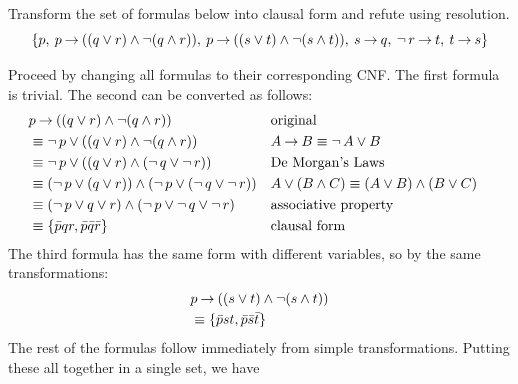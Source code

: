 \documentclass[]{exam}
\begin{document}
\begin{questions}

\question Transform the set of formulas below into clausal form and refute 
          using resolution.
\[
  \{p,\: p\mathbin{\rightarrow} ((q\lor r) \land \mathop{\neg} (q \land r)),\: p \mathbin{\rightarrow} ((s \lor t) \land
      \mathop{\neg} (s \land t)),\:  s \mathbin{\rightarrow} q,\: \mathop{\neg} r \mathbin{\rightarrow} t,\: t \mathbin{\rightarrow} s \}
  \]
\begin{solution}
Proceed by changing all formulas to their corresponding CNF. The first formula
is trivial. The second can be converted as follows:
\begin{align*}
&p \mathbin{\rightarrow} ((q\lor r) \land \mathop{\neg} (q \land r))                            && \text{original} & \\
&\equiv \mathop{\neg} p\lor ((q\lor r) \land \mathop{\neg} (q \land r))                 && A\mathbin{\rightarrow} B \equiv \mathop{\neg} A \lor B &\\ 
&\equiv \mathop{\neg} p\lor ((q\lor r) \land (\mathop{\neg} q \lor \mathop{\neg} r))             && \text{De Morgan's Laws} &\\  
&\equiv (\mathop{\neg} p\lor (q\lor r)) \land (\mathop{\neg} p\lor (\mathop{\neg} q \lor \mathop{\neg} r))&& A \lor (B \land C) \equiv (A \lor B) \land (B \lor C)&\\ 
&\equiv (\mathop{\neg} p\lor q\lor r) \land (\mathop{\neg} p \lor \mathop{\neg} q \lor \mathop{\neg} r)   && \text{associative property} &\\   
&\equiv \{\bar{p}qr, \bar{p}\bar{q}\bar{r} \}                         && \text{clausal form}&\\ 
\end{align*}
The third formula has the same form with different variables, so by the same transformations:
\begin{align*}
&p \mathbin{\rightarrow} ((s \lor t) \land \mathop{\neg} (s \land t)) \\ 
&\equiv \{\bar{p}st, \bar{p}\bar{s}\bar{t} \} \\ 
\end{align*}
The rest of the formulas follow immediately from simple transformations.
Putting these all together in a single set, we have


\end{solution}
\end{questions}
\end{document}
